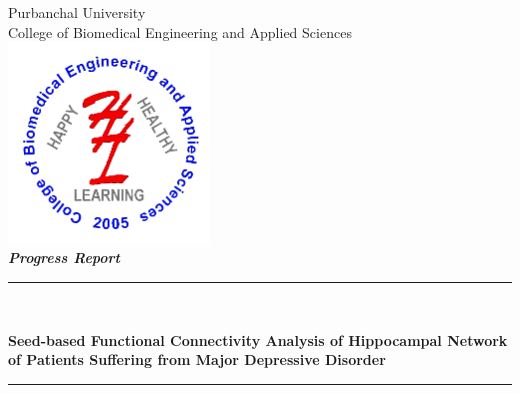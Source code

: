 \documentclass{article}
\begin{document}
\begin{titlepage}
  \selectfont
  \newcommand{\HRule}{\rule{\linewidth}{0.1mm}}

  \begin{center}

    {\huge Purbanchal University} \\[0.5cm]

    {\huge College of Biomedical Engineering and
    Applied Sciences} \\[1cm]

    \includegraphics[width=0.4\textwidth]{./.img/cbeas-logo.png} \\[1cm]

    \textbf{\Large \textit{Progress Report}} \\[0.5cm]

    \color{red}
    \HRule \\[0.4cm]
    \color{black}

    {\huge \bfseries Seed-based Functional Connectivity Analysis of
    Hippocampal Network of Patients Suffering from \linebreak Major
    Depressive Disorder}\\[-0.1cm]

    \color{red}
    \HRule \\[1.2cm]
    \color{black}


\end{center}
\end{titlepage}
\end{document}
